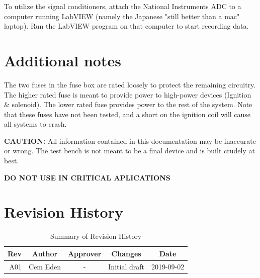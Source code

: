 \documentclass[12pt,article]{memoir}
\begin{document}
To utilize the signal conditioners, attach the National Instruments ADC to a computer running LabVIEW (namely the Japanese "still better than a mac" laptop). Run the LabVIEW program on that computer to start recording data.

\section{Additional notes}
The two fuses in the fuse box are rated loosely to protect the remaining circuitry. The higher rated fuse is meant to provide power to high-power devices (Ignition \& solenoid). The lower rated fuse provides power to the rest of the system.
Note that these fuses have not been tested, and a short on the ignition coil will cause all systems to crash.

\textbf{CAUTION:} All information contained in this documentation may be inaccurate or wrong. The test bench is not meant to be a final device and is built crudely at best.

\textbf{DO NOT USE IN CRITICAL APLICATIONS}


\newpage

\section{Revision History}
\begin{table}[H]
	\centering
	\begin{tabu}{r || c | c | c | c }
		Rev & Author & Approver & Changes & Date\\ \hline
		A01 & Cem Eden & - & Initial draft & 2019-09-02\\
	\end{tabu}
	\caption{Summary of Revision History}
	\label{tab:rev}
\end{table}

\end{document}
